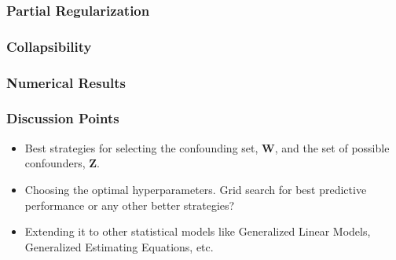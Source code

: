 \documentclass{beamer}
\begin{document}
\begin{frame}
	\frametitle{Partial Regularization}
\end{frame}

\begin{frame}
	\frametitle{Collapsibility}
\end{frame}

\begin{frame}
	\frametitle{Numerical Results}
\end{frame}

\begin{frame}
	\frametitle{Discussion Points}
	\begin{itemize}
		\item Best strategies for selecting the confounding set, $
			\bm{W} $, and the set of possible confounders, $ \bm{Z}
			$.
		\item Choosing the optimal hyperparameters. Grid search for best 
			predictive performance or any other better strategies?
		\item Extending it to other statistical models like Generalized
			Linear Models, Generalized Estimating Equations, etc.
	\end{itemize}
\end{frame}
\end{document}
